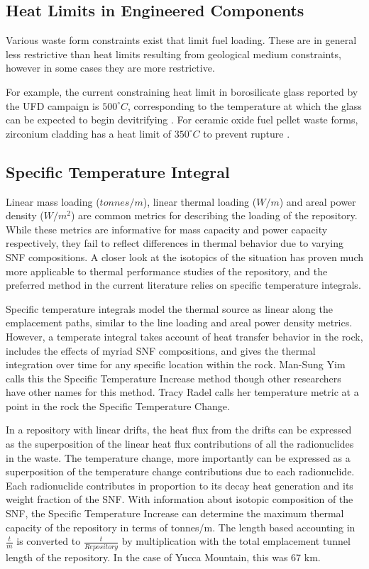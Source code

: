 \subsection{Heat Limits in Engineered Components} 

Various waste form constraints exist that limit fuel loading. These are 
in general less restrictive than heat limits resulting from geological medium 
constraints, however in some cases they are more restrictive. 

For example, the current constraining heat limit in borosilicate glass 
reported by the \gls{UFD} campaign is $500^{\circ}C$, corresponding to the 
temperature at which the glass can be expected to begin devitrifying 
\cite{carter_disposal_2010, hardin_generic_2011, soelberg_heat_2009}. For ceramic oxide 
fuel pellet waste forms, zirconium cladding has a heat limit of $350^{\circ}C$ 
to prevent rupture \cite{soelberg_heat_2009}.

\subsection{Specific Temperature Integral}

Linear mass loading ($tonnes/m$), linear thermal loading ($W/m$) and areal power 
density ($W/m^2$) are common metrics
for describing the loading of the repository. While these metrics are
informative for mass capacity and power capacity respectively, they fail to
reflect differences in thermal behavior due to varying SNF compositions.  A
closer look at the isotopics of the situation has proven much more applicable
to thermal performance studies of the repository, and the preferred method in
the current literature relies on specific temperature integrals.


Specific temperature integrals model the thermal source as linear along the
emplacement paths, similar to the line loading and areal power density metrics.
However, a temperate integral takes account of heat transfer behavior in the
rock, includes the effects of myriad SNF compositions, and gives the thermal
integration over time for any specific location within the rock.  Man-Sung Yim
calls this the Specific Temperature Increase method\cite{li_specific_2008}
though other researchers have other names for this method. Tracy Radel calls
her temperature metric at a point in the rock the Specific Temperature
Change\cite{radel_repository_2007}.

In a repository with linear drifts, the heat flux from the drifts can be
expressed as the superposition of the linear heat flux contributions of all the
radionuclides in the waste. The temperature change, more importantly can be 
expressed as a superposition of the temperature change contributions due to  
each radionuclide. Each radionuclide contributes in proportion to its
decay heat generation and its weight fraction of the SNF. With information
about isotopic composition of the SNF, the Specific Temperature Increase can
determine the maximum thermal capacity of the repository in terms of tonnes/m.
The length based accounting in $\frac{t}{m}$ is converted to
$\frac{t}{Repository}$ by multiplication with the total emplacement tunnel
length of the repository.  In the case of Yucca Mountain, this was 67 km.

